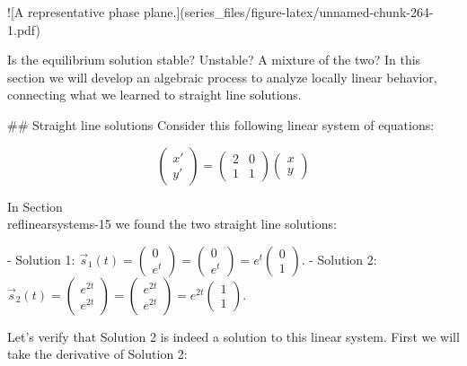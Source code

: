 \documentclass[
]{book}
\theoremstyle{definition}
\theoremstyle{definition}
\theoremstyle{definition}
\theoremstyle{remark}
\begin{document}
![\label{fig:unnamed-chunk-264}A representative phase plane.](series_files/figure-latex/unnamed-chunk-264-1.pdf) 


Is the equilibrium solution stable?  Unstable?  A mixture of the two?  In this section we will develop an algebraic process to analyze locally linear behavior, connecting what we learned to straight line solutions.


## Straight line solutions
Consider this following linear system of equations:

\begin{equation} \label{eq:system-ch18}
\begin{pmatrix} x' \\ y' \end{pmatrix} =\begin{pmatrix} 2 & 0 \\ 1 &  1 \end{pmatrix} \begin{pmatrix} x \\ y \end{pmatrix}
\end{equation}

In Section \\ref{linearsystems-15} we found the two straight line solutions:

- Solution 1: $\displaystyle  \vec{s}_{1}(t) = \begin{pmatrix} 0 \\ e^{t} \end{pmatrix}= \begin{pmatrix} 0 \\ e^{t} \end{pmatrix} =e^{t}  \begin{pmatrix} 0 \\ 1  \end{pmatrix}$.
- Solution 2:  $\displaystyle \vec{s}_{2}(t) = \begin{pmatrix} e^{2t} \\ e^{2t} \end{pmatrix}= \begin{pmatrix} e^{2t} \\ e^{2t} \end{pmatrix} = e^{2t}  \begin{pmatrix} 1 \\ 1\end{pmatrix}$. 

Let's verify that Solution 2 is indeed a solution to this linear system.  First we will take the derivative of Solution 2:
\end{document}
